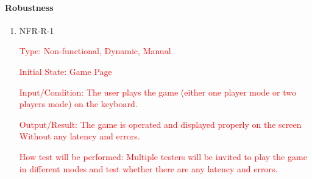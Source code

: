 \documentclass[12pt, titlepage]{article}
\begin{document}
\paragraph{Robustness}

\begin{enumerate}

\item{NFR-R-1\\}

\textcolor{red}{Type: Non-functional, Dynamic, Manual}
					
\textcolor{red}{Initial State: Game Page}
					
\textcolor{red}{Input/Condition: The user plays the game (either one player mode or
two players mode) on the keyboard.} 
					
\textcolor{red}{Output/Result: The game is operated and displayed properly
on the screen Without any latency and errors.}
					
\textcolor{red}{How test will be performed:  Multiple testers will be invited to play
the game in different modes and test whether there are any latency and errors.}
					

\end{enumerate}

\newpage
\end{document}
